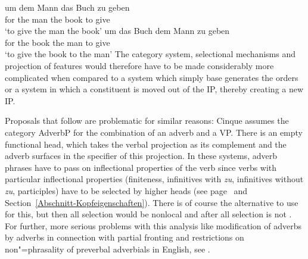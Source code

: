 \eal
\ex 
\gll um dem Mann das Buch zu geben\\
     for the man the book to give\\
\glt `to give the man the book'
\ex 
\gll um das Buch dem Mann zu geben\\
     for the book the man to give\\
\glt `to give the book to the man'
\zl
The category system, selectional mechanisms and projection of features would therefore have to be made
considerably more complicated when compared to a system which simply base generates the orders or a
system in which a constituent is moved out of the IP, thereby creating a new IP. 

Proposals that follow \citet{Cinque99a-u} are problematic for similar reasons: Cinque assumes the
category AdverbP for the combination of an adverb and a VP. There is an empty functional head, which
takes the verbal projection as its complement and the adverb surfaces in the specifier of this projection. In these systems, adverb phrases have to pass on inflectional
properties of the verb since verbs with particular inflectional properties (finiteness, infinitives with \emph{zu}, infinitives without \emph{zu},
participles) have to be selected by higher heads (see page~\pageref{Beispiel-GPSG-Kopfeigenschaften} and
Section~\ref{Abschnitt-Kopfeigenschaften}). There is of course the alternative to use  for this,
but then all selection would be nonlocal and after all selection is not . For further, more serious problems with this analysis like
modification of adverbs by adverbs in connection with partial fronting and restrictions on
non"=phrasality of preverbal adverbials in English, see .

